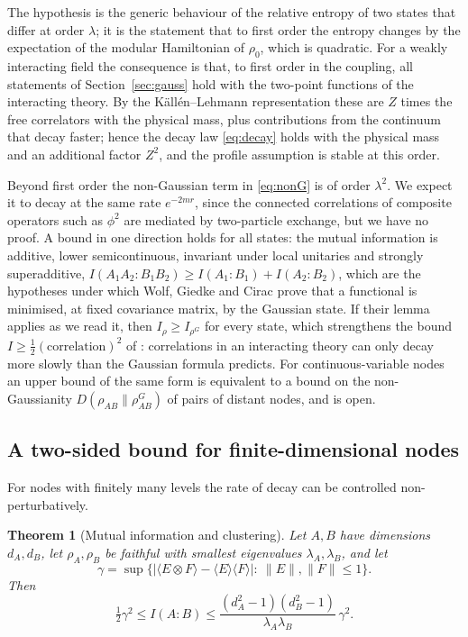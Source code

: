 \documentclass[11pt,a4paper]{article}
\theoremstyle{stmt}
\newtheorem{theorem}{Theorem}[section]
\theoremstyle{defn}
\theoremstyle{rmk}
\numberwithin{equation}{section}
\begin{document}
The hypothesis is the generic behaviour of the relative entropy of two states that differ at order $\lambda$; it is the statement that to first order the entropy changes by the expectation of the modular Hamiltonian of $\rho_0$, which is quadratic. For a weakly interacting field the consequence is that, to first order in the coupling, all statements of Section~\ref{sec:gauss} hold with the two-point functions of the interacting theory. By the K\"all\'en--Lehmann representation these are $Z$ times the free correlators with the physical mass, plus contributions from the continuum that decay faster; hence the decay law \eqref{eq:decay} holds with the physical mass and an additional factor $Z^2$, and the profile assumption is stable at this order.

Beyond first order the non-Gaussian term in \eqref{eq:nonG} is of order $\lambda^2$. We expect it to decay at the same rate $e^{-2mr}$, since the connected correlations of composite operators such as $\phi^2$ are mediated by two-particle exchange, but we have no proof. A bound in one direction holds for all states: the mutual information is additive, lower semicontinuous, invariant under local unitaries and strongly superadditive, $I(A_1A_2:B_1B_2)\ge I(A_1:B_1)+I(A_2:B_2)$, which are the hypotheses under which Wolf, Giedke and Cirac \cite{WGC} prove that a functional is minimised, at fixed covariance matrix, by the Gaussian state. If their lemma applies as we read it, then $I_\rho\ge I_{\rho^G}$ for every state, which strengthens the bound $I\ge\tfrac12(\text{correlation})^2$ of \cite{WVHC}: correlations in an interacting theory can only decay more slowly than the Gaussian formula predicts. For continuous-variable nodes an upper bound of the same form is equivalent to a bound on the non-Gaussianity $D(\rho_{AB}\|\rho^G_{AB})$ of pairs of distant nodes, and is open.

\subsection{A two-sided bound for finite-dimensional nodes}

For nodes with finitely many levels the rate of decay can be controlled non-perturbatively.

\begin{theorem}[Mutual information and clustering]\label{thm:cluster2}
Let $A,B$ have dimensions $d_A,d_B$, let $\rho_A,\rho_B$ be faithful with smallest eigenvalues $\lambda_A,\lambda_B$, and let
\begin{equation}
\gamma=\sup\big\{|\langle E\otimes F\rangle-\langle E\rangle\langle F\rangle|:\ \|E\|,\|F\|\le1\big\}.
\end{equation}
Then
\begin{equation}\label{eq:twosidedMI}
\tfrac12\gamma^2\le I(A:B)\le\frac{(d_A^2-1)(d_B^2-1)}{\lambda_A\lambda_B}\,\gamma^2 .
\end{equation}
\end{theorem}
\end{document}
